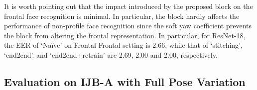\documentclass[10pt,twocolumn,letterpaper]{article}
\begin{document}
It is worth pointing out that the impact introduced by the proposed block on the frontal face recognition is minimal. In particular, the block hardly affects the performance of non-profile face recognition since the soft yaw coefficient prevents the block from altering the frontal representation. In particular, for ResNet-18, the EER of `Na\"{i}ve' on Frontal-Frontal setting is 2.66, while that of `stitching', `end2end'. and `end2end+retrain' are 2.69, 2.00 and 2.00, respectively.






\subsection{Evaluation on IJB-A with Full Pose Variation}
\end{document}
